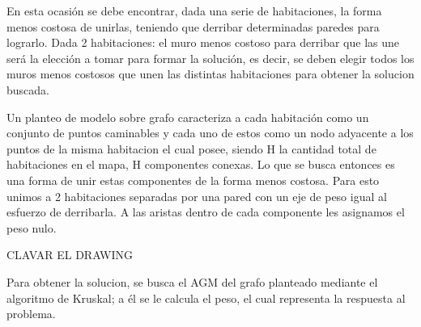 En esta ocasión se debe encontrar, dada una serie de habitaciones, la forma menos costosa de unirlas, teniendo que derribar determinadas paredes para lograrlo. Dada 2 habitaciones: el muro menos costoso para derribar que las une será la elección a tomar para formar la solución, es decir, se deben elegir todos los muros menos costosos que unen las distintas habitaciones para obtener la solucion buscada.

Un planteo de modelo sobre grafo caracteriza a cada habitación como un conjunto de puntos caminables y cada uno de estos como un nodo adyacente a los puntos de la misma habitacion el cual posee, siendo H la cantidad total de habitaciones en el mapa, H componentes conexas. Lo que se busca entonces es una forma de unir estas componentes de la forma menos costosa. Para esto unimos a 2 habitaciones separadas por una pared con un eje de peso igual al esfuerzo de derribarla. A las aristas dentro de cada componente les asignamos el peso nulo.

CLAVAR EL DRAWING

Para obtener la solucion, se busca el AGM del grafo planteado mediante el algoritmo de Kruskal; a él se le calcula el peso, el cual representa la respuesta al problema.

